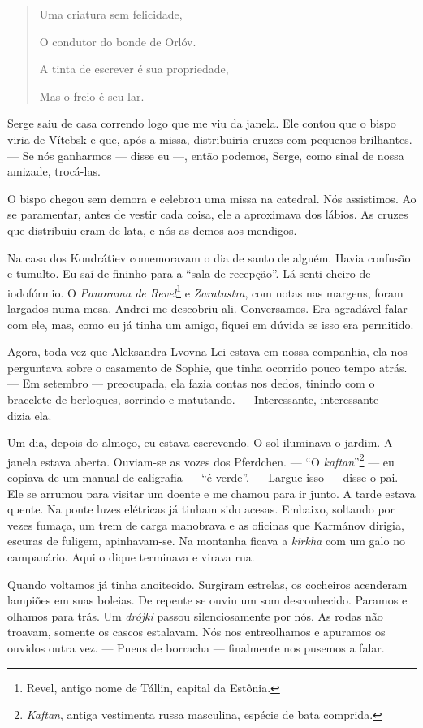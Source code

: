 \begin{verse}
Uma criatura sem felicidade,

O condutor do bonde de Orlóv.

A tinta de escrever é sua propriedade,

Mas o freio é seu lar.
\end{verse}

Serge saiu de casa correndo logo que me viu da janela. Ele contou que o
bispo viria de Vítebsk e que, após a missa, distribuiria cruzes com
pequenos brilhantes. --- Se nós ganharmos --- disse eu ---, então
podemos, Serge, como sinal de nossa amizade, trocá-las.

O bispo chegou sem demora e celebrou uma missa na catedral. Nós
assistimos. Ao se paramentar, antes de vestir cada coisa, ele a
aproximava dos lábios. As cruzes que distribuiu eram de lata, e nós as
demos aos mendigos.

Na casa dos Kondrátiev comemoravam o dia de santo de alguém. Havia
confusão e tumulto. Eu saí de fininho para a ``sala de recepção''. Lá
senti cheiro de iodofórmio. O \emph{Panorama de Revel}\footnote{Revel,
  antigo nome de Tállin, capital da Estônia.} e \emph{Zaratustra}, com
notas nas margens, foram largados numa mesa. Andrei me descobriu ali.
Conversamos. Era agradável falar com ele, mas, como eu já tinha um
amigo, fiquei em dúvida se isso era permitido.

Agora, toda vez que Aleksandra Lvovna Lei estava em nossa companhia, ela
nos perguntava sobre o casamento de Sophie, que tinha ocorrido pouco
tempo atrás. --- Em setembro --- preocupada, ela fazia contas nos dedos,
tinindo com o bracelete de berloques, sorrindo e matutando. ---
Interessante, interessante --- dizia ela.

Um dia, depois do almoço, eu estava escrevendo. O sol iluminava o
jardim. A janela estava aberta. Ouviam-se as vozes dos Pferdchen. ---
``O \emph{kaftan}''\footnote{\emph{Kaftan}, antiga vestimenta russa
  masculina, espécie de bata comprida.} --- eu copiava de um manual de
caligrafia --- ``é verde''. --- Largue isso --- disse o pai. Ele se
arrumou para visitar um doente e me chamou para ir junto. A tarde estava
quente. Na ponte luzes elétricas já tinham sido acesas. Embaixo,
soltando por vezes fumaça, um trem de carga manobrava e as oficinas que
Karmánov dirigia, escuras de fuligem, apinhavam-se. Na montanha ficava a
\emph{kirkha} com um galo no campanário. Aqui o dique terminava e virava
rua.

Quando voltamos já tinha anoitecido. Surgiram estrelas, os cocheiros
acenderam lampiões em suas boleias. De repente se ouviu um som
desconhecido. Paramos e olhamos para trás. Um \emph{drójki} passou
silenciosamente por nós. As rodas não troavam, somente os cascos
estalavam. Nós nos entreolhamos e apuramos os ouvidos outra vez. ---
Pneus de borracha --- finalmente nos pusemos a falar.

